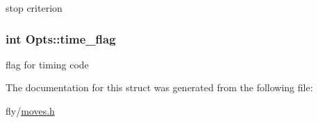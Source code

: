 \label{structOpts_aa3c1c207619bfefd825aebdc7717fcc2}
stop criterion \hypertarget{structOpts_a9592fe5904bc813ae316fe95a0711053}{
\subsubsection[{time\_\-flag}]{\setlength{\rightskip}{0pt plus 5cm}int {\bf Opts::time\_\-flag}}}
\label{structOpts_a9592fe5904bc813ae316fe95a0711053}
flag for timing code 

The documentation for this struct was generated from the following file:\begin{DoxyCompactItemize}
\item 
fly/\hyperlink{moves_8h}{moves.h}\end{DoxyCompactItemize}
